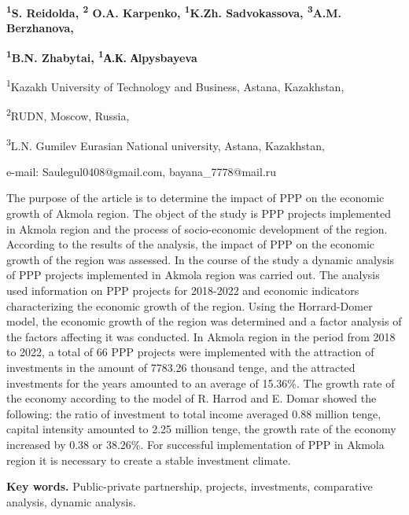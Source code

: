 \begin{center}
{\bfseries \textsuperscript{1}S. Reidolda\envelope,
\textsuperscript{2} O.A. Karpenko, \textsuperscript{1}K.Zh.
Sadvokassova, \textsuperscript{3}A.M. Berzhanova,}

{\bfseries \textsuperscript{1}B.N. Zhabytai\envelope,
\textsuperscript{1}А.К.} {\bfseries Аlpysbayeva}

\textsuperscript{1}Kazakh University of Technology and Business, Astana,
Kazakhstan,

\textsuperscript{2}RUDN, Moscow, Russia,

\textsuperscript{3}L.N. Gumilev Eurasian National university, Astana,
Kazakhstan,

e-mail: Saulegul0408@gmail.com, bayana\_7778@mail.ru
\end{center}

The purpose of the article is to determine the impact of PPP on the
economic growth of Akmola region. The object of the study is PPP
projects implemented in Akmola region and the process of socio-economic
development of the region. According to the results of the analysis, the
impact of PPP on the economic growth of the region was assessed. In the
course of the study a dynamic analysis of PPP projects implemented in
Akmola region was carried out. The analysis used information on PPP
projects for 2018-2022 and economic indicators characterizing the
economic growth of the region. Using the Horrard-Domer model, the
economic growth of the region was determined and a factor analysis of
the factors affecting it was conducted. In Akmola region in the period
from 2018 to 2022, a total of 66 PPP projects were implemented with the
attraction of investments in the amount of 7783.26 thousand tenge, and
the attracted investments for the years amounted to an average of
15.36\%. The growth rate of the economy according to the model of R.
Harrod and E. Domar showed the following: the ratio of investment to
total income averaged 0.88 million tenge, capital intensity amounted to
2.25 million tenge, the growth rate of the economy increased by 0.38 or
38.26\%. For successful implementation of PPP in Akmola region it is
necessary to create a stable investment climate.

{\bfseries Key words.} Public-private partnership, projects, investments,
comparative analysis, dynamic analysis.

